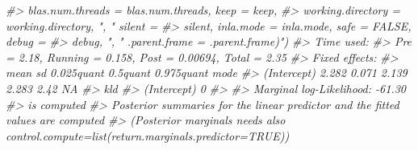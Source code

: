 \documentclass[
]{book}
\newenvironment{Shaded}{\begin{snugshade}}{\end{snugshade}}
\newcommand{\CommentTok}[1]{\textcolor[rgb]{0.56,0.35,0.01}{\textit{#1}}}
\begin{document}
\begin{Shaded}
\begin{Highlighting}[]
\CommentTok{\#\textgreater{}    blas.num.threads = blas.num.threads, keep = keep, }
\CommentTok{\#\textgreater{}    working.directory = working.directory, ", " silent = }
\CommentTok{\#\textgreater{}    silent, inla.mode = inla.mode, safe = FALSE, debug = }
\CommentTok{\#\textgreater{}    debug, ", " .parent.frame = .parent.frame)") }
\CommentTok{\#\textgreater{} Time used:}
\CommentTok{\#\textgreater{}     Pre = 2.18, Running = 0.158, Post = 0.00694, Total = 2.35 }
\CommentTok{\#\textgreater{} Fixed effects:}
\CommentTok{\#\textgreater{}              mean    sd 0.025quant 0.5quant 0.975quant mode}
\CommentTok{\#\textgreater{} (Intercept) 2.282 0.071      2.139    2.283       2.42   NA}
\CommentTok{\#\textgreater{}             kld}
\CommentTok{\#\textgreater{} (Intercept)   0}
\CommentTok{\#\textgreater{} }
\CommentTok{\#\textgreater{} Marginal log{-}Likelihood:  {-}61.30 }
\CommentTok{\#\textgreater{}  is computed }
\CommentTok{\#\textgreater{} Posterior summaries for the linear predictor and the fitted values are computed}
\CommentTok{\#\textgreater{} (Posterior marginals needs also \textquotesingle{}control.compute=list(return.marginals.predictor=TRUE)\textquotesingle{})}
\end{Highlighting}
\end{Shaded}


  
\end{document}
